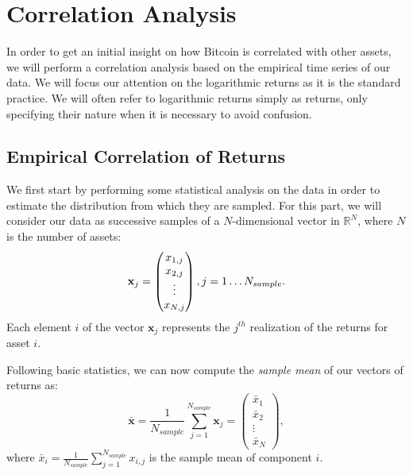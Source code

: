 \chapter{Correlation Analysis}
\label{chpr:corr_analysis}
In order to get an initial insight on how Bitcoin is correlated with other assets, we will perform a correlation analysis based on the empirical time series of our data. We will focus our attention on the logarithmic returns as it is the standard practice. We will often refer to logarithmic returns simply as returns, only specifying their nature when it is necessary to avoid confusion.


\bigskip

\section{Empirical Correlation of Returns}
\label{emp_corr}

We first start by performing some statistical analysis on the data in order to estimate the distribution from which they are sampled.
For this part, we will consider our data as successive samples of a $N$-dimensional vector in $\mathbb{R}^{N}$, where $N$ is the number of assets:
\begin{equation*}
	\mathbf{x}_{j}\\
	 = \begin{pmatrix}
	x_{1,j} \\
	x_{2,j}	\\
	\vdots\\
	x_{N,j}
	\end{pmatrix} , j = 1 \dots N_{sample}.
\end{equation*}
Each element $i$ of the vector $\mathbf{x}_j$ represents the $j^{th}$ realization of the returns for asset $i$.

Following basic statistics, we can now compute the \textit{sample mean} of our vectors of returns as:
\begin{equation*}
	\mathbf{\bar{x}} = \frac{1}{N_{sample}} \sum_{j=1}^{N_{sample}} \mathbf{x}_j =
	\begin{pmatrix}
	\bar{x}_{1} \\
	\bar{x}_{2}	\\
	\vdots\\
	\bar{x}_{N}
	\end{pmatrix},
\end{equation*}
where $\bar{x}_{i} = \frac{1}{N_{sample}} \sum_{j=1}^{N_{sample}} x_{i,j}$ is the sample mean of component $i$.

